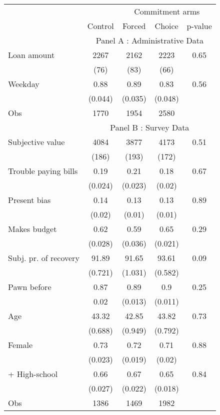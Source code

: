\begin{tabular}{lcccc}
\toprule
      &       & \multicolumn{3}{c}{Commitment arms} \\
\cmidrule{3-5}      & \multicolumn{1}{p{4.545em}}{Control} & \multicolumn{1}{p{4.955em}}{Forced} & \multicolumn{1}{p{3.455em}}{Choice} & \multicolumn{1}{p{3.455em}}{p-value} \\
\midrule
      & \multicolumn{4}{c}{Panel A : Administrative Data} \\
\midrule
\midrule
Loan amount  & 2267  & 2162  & 2223  & 0.65 \\
      & (76)  & (83)  & (66)  &  \\
Weekday & 0.88  & 0.89  & 0.83  & 0.56 \\
      & (0.044) & (0.035) & (0.048) &  \\
\midrule
Obs   & 1770  & 1954  & 2580  &  \\
\midrule
      & \multicolumn{4}{c}{Panel B : Survey Data} \\
\midrule
\midrule
Subjective value & 4084  & 3877  & 4173  & 0.51 \\
      & (186) & (193) & (172) &  \\
Trouble paying bills & 0.19  & 0.21  & 0.18  & 0.67 \\
      & (0.024) & (0.023) & (0.02) &  \\
Present bias & 0.14  & 0.13  & 0.13  & 0.89 \\
      & (0.02) & (0.01) & (0.01) &  \\
Makes budget & 0.62  & 0.59  & 0.65  & 0.29 \\
      & (0.028) & (0.036) & (0.021) &  \\
Subj. pr. of recovery & 91.89 & 91.65 & 93.61 & 0.09 \\
      & (0.721) & (1.031) & (0.582) &  \\
Pawn before & 0.87  & 0.89  & 0.9   & 0.25 \\
      & 0.02  & (0.013) & (0.011) &  \\
Age   & 43.32 & 42.85 & 43.82 & 0.73 \\
      & (0.688) & (0.949) & (0.792) &  \\
Female & 0.73  & 0.72  & 0.71  & 0.88 \\
      & (0.023) & (0.019) & (0.02) &  \\
+ High-school & 0.66  & 0.67  & 0.65  & 0.84 \\
      & (0.027) & (0.022) & (0.018) &  \\
\midrule
Obs   & 1386  & 1469  & 1982  &  \\
\bottomrule
\bottomrule
\end{tabular}%
